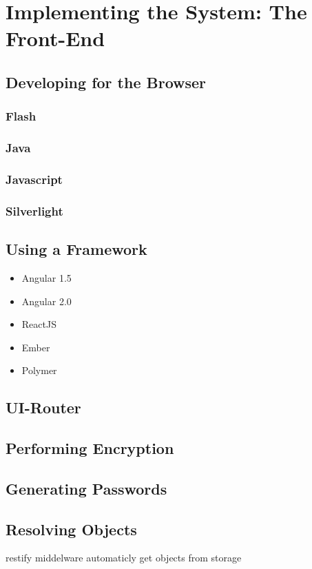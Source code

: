 \chapter{Implementing the System: The Front-End}
	\section{Developing for the Browser}
		\subsection{Flash}
		\subsection{Java}
		\subsection{Javascript}
		\subsection{Silverlight}


	\section{Using a Framework}
		\begin{itemize}
			\item Angular 1.5
			\item Angular 2.0
			\item ReactJS
			\item Ember
			\item Polymer
		\end{itemize}


	\section{UI-Router}
		\label{sec:impl:ui-router}

	\section{Performing Encryption}

	\section{Generating Passwords}


	
	\section{Resolving Objects}
		restify middelware automaticly get objects from storage
